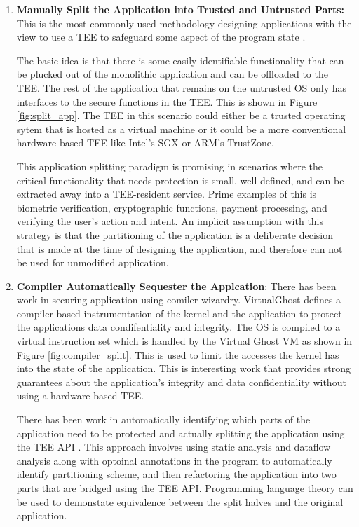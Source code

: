 \begin{enumerate}
    \item \textbf{Manually Split the Application into Trusted and Untrusted
    Parts:} This is the most commonly used methodology designing applications
    with the view to use a TEE to safeguard some aspect of the program state 
    \cite{TLR,Proxos,SchrodinText,liu2014veriui}. 
    
    The basic idea is that there is some easily identifiable functionality that
    can be plucked out of the monolithic application and can be offloaded to the
    TEE. The rest of the application that remains on the untrusted OS only has
    interfaces to the secure functions in the TEE. This is shown in Figure
    \ref{fig:split_app}. The TEE in this scenario could either be a trusted
    operating sytem that is hosted as a virtual machine or it could be a
    more conventional hardware based TEE like Intel's SGX or ARM's TrustZone. 

    This application splitting paradigm is promising in scenarios where the
    critical functionality that needs protection is small, well defined, and can
    be extracted away into a TEE-resident service. Prime examples of this is
    biometric verification, cryptographic functions, payment processing, and
    verifying the user's action and intent. An implicit assumption with this
    strategy is that the partitioning of the application is a deliberate
    decision that is made at the time of designing the application, and
    therefore can not be used for unmodified application. 
    
    \item \textbf{Compiler Automatically Sequester the Applcation}: There has
    been work in securing application using comiler wizardry. VirtualGhost
    \cite{criswell2014virtual} defines a compiler based instrumentation of the
    kernel and the application to protect the applications data condifentiality
    and integrity. The OS is compiled to a virtual instruction set which is
    handled by the Virtual Ghost VM as shown in Figure \ref{fig:compiler_split}.
    This  is used to limit the accesses the kernel has into
    the state of the application. This is interesting work that provides strong
    guarantees about the application's integrity and data confidentiality
    without using a hardware based TEE. 
    
    There has been work in automatically identifying which parts of the
    application need to be protected and actually splitting the application
    using the TEE API \cite{rubinov2016automated, lind2017glamdring}. This
    approach involves using static analysis and dataflow analysis along with
    optoinal annotations in the program to automatically identify partitioning
    scheme, and then refactoring the application into two parts that are bridged
    using the TEE API. Programming language theory can be used to
    demonstate equivalence between the split halves and the original
    application. 


\end{enumerate}
